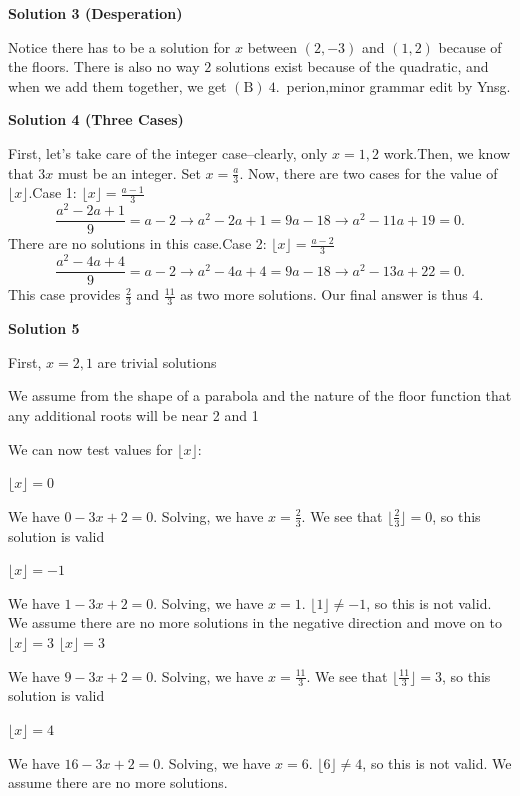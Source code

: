 \begin{enumerate}
 



\textbf{Solution 3 (Desperation)}

Notice there has to be a solution for $x$ between $(2,-3)$ and $(1,2)$ because of the floors. There is also no way $2$ solutions exist because of the quadratic, and when we add them together, we get $\boxed{(\text{B}) \ 4}.$~perion,minor grammar edit by Ynsg.

 



\textbf{Solution 4 (Three Cases)}

First, let's take care of the integer case--clearly, only $x=1,2$ work.Then, we know that $3x$ must be an integer. Set $x=\frac{a}3$. Now, there are two cases for the value of $\lfloor x\rfloor$.Case 1: $\lfloor x\rfloor=\frac{a-1}{3}$
 \[\frac{a^2-2a+1}{9}=a-2\rightarrow a^2-2a+1=9a-18\rightarrow a^2-11a+19=0.\]There are no solutions in this case.Case 2: $\lfloor x\rfloor=\frac{a-2}{3}$
 \[\frac{a^2-4a+4}{9}=a-2\rightarrow a^2-4a+4=9a-18\rightarrow a^2-13a+22=0.\]This case provides $\frac23$ and $\frac{11}3$ as two more solutions. Our final answer is thus $\boxed{4}$.

 



\textbf{Solution 5}

First, $x=2,1$ are trivial solutions

 We assume from the shape of a parabola and the nature of the floor function that any additional roots will be near 2 and 1

 We can now test values for $\lfloor{x}\rfloor$:

 $\lfloor{x}\rfloor=0$

 We have $0-3x+2=0$. Solving, we have $x=\frac{2}{3}$. We see that $\lfloor{\frac{2}{3}}\rfloor=0$, so this solution is valid

 $\lfloor{x}\rfloor=-1$

 We have $1-3x+2=0$. Solving, we have $x=1$. $\lfloor{1}\rfloor\neq-1$, so this is not valid. We assume there are no more solutions in the negative direction and move on to $\lfloor{x}\rfloor=3$
$\lfloor{x}\rfloor=3$

 We have $9-3x+2=0$. Solving, we have $x=\frac{11}{3}$. We see that $\lfloor{\frac{11}{3}}\rfloor=3$, so this solution is valid

 $\lfloor{x}\rfloor=4$

 We have $16-3x+2=0$. Solving, we have $x=6$. $\lfloor{6}\rfloor\neq4$, so this is not valid. We assume there are no more solutions.


\end{enumerate}
